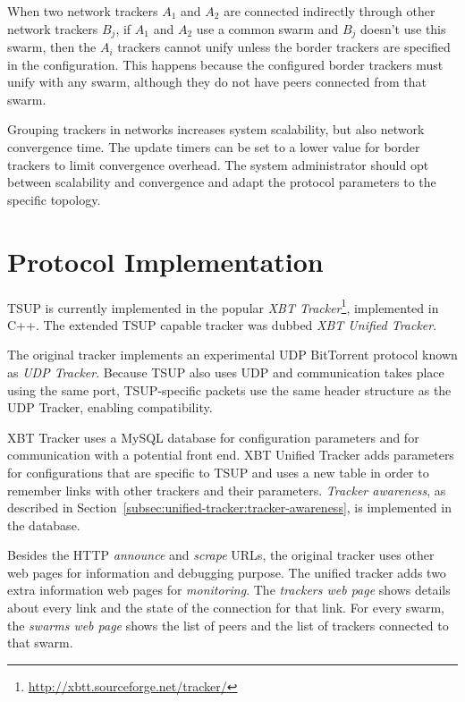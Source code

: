 When two network trackers $A_{1}$ and $A_{2}$ are connected indirectly through
other network trackers $B_{j}$, if $A_{1}$ and $A_{2}$ use a common swarm and
$B_{j}$ doesn't use this swarm, then the $A_{i}$ trackers cannot unify unless
the border trackers are specified in the configuration. This happens because
the configured border trackers must unify with any swarm, although they do not
have peers connected from that swarm.

Grouping trackers in networks increases system scalability, but also network
convergence time. The update timers can be set to a lower value for border
trackers to limit convergence overhead.  The system administrator should opt
between scalability and convergence and adapt the protocol parameters to the
specific topology.

\section{Protocol Implementation}
\label{sec:unified-tracker:implementation}

TSUP is currently implemented in the popular \textit{XBT
Tracker}\footnote{\url{http://xbtt.sourceforge.net/tracker/}}, implemented in C++.
The extended TSUP capable tracker was dubbed \textit{XBT Unified Tracker}.

The original tracker implements an experimental UDP BitTorrent protocol
known as \textit{UDP Tracker}. Because TSUP also uses UDP and communication
takes place using the same port, TSUP-specific packets use the same header
structure as the UDP Tracker, enabling compatibility.

XBT Tracker uses a MySQL database for configuration parameters and for
communication with a potential front end. XBT Unified Tracker adds parameters
for configurations that are specific to TSUP and uses a new table in order to
remember links with other trackers and their parameters.  \textit{Tracker
awareness}, as described in
Section~\ref{subsec:unified-tracker:tracker-awareness}, is implemented in the
database.

Besides the HTTP \textit{announce} and \textit{scrape} URLs, the original
tracker uses other web pages for information and debugging purpose. The
unified tracker adds two extra information web pages for \textit{monitoring}.
The \textit{trackers web page} shows details about every link and the state of
the connection for that link. For every swarm, the \textit{swarms web page}
shows the list of peers and the list of trackers connected to that swarm.


